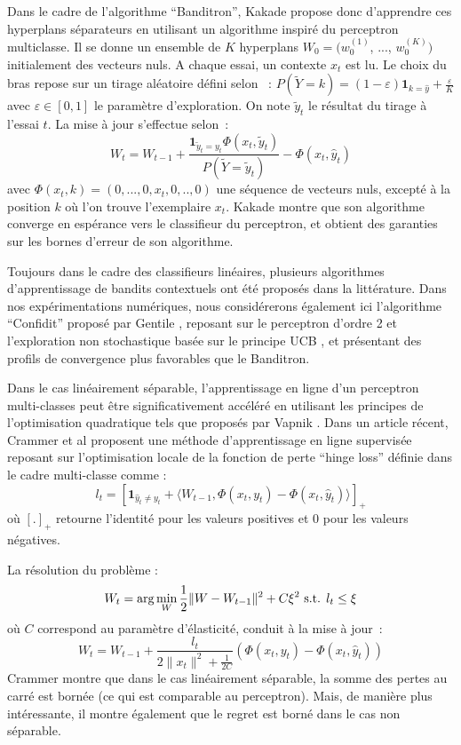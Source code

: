 \documentclass[twocolumn]{article}
\begin{document}
Dans le cadre de l'algorithme ``Banditron'', Kakade propose donc d'apprendre ces hyperplans séparateurs en utilisant un algorithme inspiré du perceptron multiclasse. Il se donne un ensemble de $K$ hyperplans $W_0 = (w^{(1)}_0$, ..., $w^{(K)}_0)$ initialement des vecteurs nuls. A chaque essai, un contexte $x_t$ est lu. Le choix du bras repose sur un tirage aléatoire défini selon~ : $P(\tilde{Y}=k) = (1 - \varepsilon) \mathbf{1}_{k = \hat{y}} + \frac{\varepsilon}{K} $ avec $\varepsilon \in [0,1]$ le paramètre d'exploration. On note $\tilde{y}_t$ le résultat du tirage à l'essai $t$. La mise à jour s'effectue selon~:
$$ W_t = W_{t-1} + \frac{\mathbf{1}_{\tilde{y}_t = y_t} \Phi(x_t,\tilde{y}_t)}{P(\tilde{Y}=\tilde{y}_t)} - \Phi(x_t,\hat{y}_t)$$   
avec $\Phi(x_t,k) = (0, ..., 0,  x_t, 0, .., 0)$ une séquence de vecteurs nuls, excepté à la position $k$ où l'on trouve l'exemplaire $x_t$. Kakade montre que son algorithme converge en espérance vers le classifieur du perceptron, et obtient des garanties sur les bornes d'erreur de son algorithme. 

Toujours dans le cadre des classifieurs linéaires, plusieurs algorithmes d'apprentissage de bandits contextuels ont été proposés dans la littérature. Dans nos expérimentations numériques, nous considérerons également ici l'algorithme ``Confidit'' proposé par Gentile \cite{XXX}, reposant sur le perceptron d'ordre 2 et l'exploration non stochastique basée sur le principe UCB \cite{XXX}, et présentant des profils de convergence plus favorables que le Banditron. 


Dans le cas linéairement séparable, l'apprentissage en ligne d'un perceptron multi-classes peut être significativement accéléré en utilisant les principes de l'optimisation quadratique tels que proposés par Vapnik \cite{XXX}. Dans un article récent, Crammer et al \cite{XXX} proposent une méthode d'apprentissage en ligne supervisée reposant sur l'optimisation locale de la fonction de perte ``hinge loss'' définie dans le cadre multi-classe comme : 
$$
	 l_t =[\mathbf{1}_{\hat{y}_t\neq y_t} + \langle W_{t-1}, \Phi(x_t,y_t)- \Phi(x_t,\hat{y}_t)\rangle]_+ 
$$
où $[.]_+$ retourne l'identité pour les valeurs positives et 0 pour les valeurs négatives. 

La résolution du problème :
$$W_{t} = \arg \min_W \frac{1}{2} \| W - W_{t-1}\|^2 + C \xi^2 \hbox{ s.t. } l_t \leq \xi$$
où $C$ correspond au paramètre d'élasticité, conduit à la mise à jour~:
$$W_{t} =  W_{t-1} + \frac{l_t}{2\|x_t\|^2 + \frac{1}{2C}} (\Phi(x_t,y_t) - \Phi(x_t,\hat{y}_t))$$
Crammer montre que dans le cas linéairement séparable, la somme des pertes au carré est bornée (ce qui est comparable au perceptron). Mais, de manière plus intéressante, il montre également que le regret est  borné dans le cas non séparable.  
\end{document}
